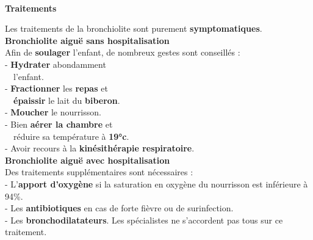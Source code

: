 \documentclass[a0paper,portrait]{baposter}
\begin{document}
\begin{poster}
{\begin{minipage}{\linewidth}
    \textbf{\textcolor{Mycolor1}{}}\\
    {\large{\textbf{\textcolor{Mycolor1}{Traitements}}}}
    \RaggedRight
    \vspace{0.1cm}

Les traitements de la bronchiolite sont purement \textbf{symptomatiques}.\\
\vspace{0.1cm}
\textbf{\textcolor{Mycolor2}{Bronchiolite aiguë sans \mbox{hospitalisation}}}\\
\vspace{0.03cm}
Afin de \textbf{soulager} l’enfant, de nombreux gestes sont conseillés :\\
- \textbf{Hydrater} abondamment \\ \ \  l’enfant.\\
- \textbf{Fractionner} les \textbf{repas} et \\ \ \ \textbf{épaissir} le lait du \textbf{biberon}.\\
- \textbf{Moucher} le nourrisson.\\
- Bien \textbf{aérer la chambre} et \\ \ \ \mbox{réduire} sa température à \textbf{19°c}.\\
- Avoir recours à la \textbf{kinésithérapie respiratoire}.\\
\vspace{0.1cm}
\textbf{\textcolor{Mycolor2}{Bronchiolite aiguë avec hospitalisation}}\\
\vspace{0.03cm}
Des traitements supplémentaires sont nécessaires :\\
- L’\textbf{apport d’oxygène} si la saturation en oxygène du nourrisson est inférieure à 94\%.\\
- Les \textbf{antibiotiques} en cas de forte fièvre ou de surinfection.\\
- Les \textbf{bronchodilatateurs}. Les spécialistes ne s’accordent pas tous sur ce traitement.

\end{minipage}
\vspace{0.1cm}
}
\end{poster}
\end{document}
